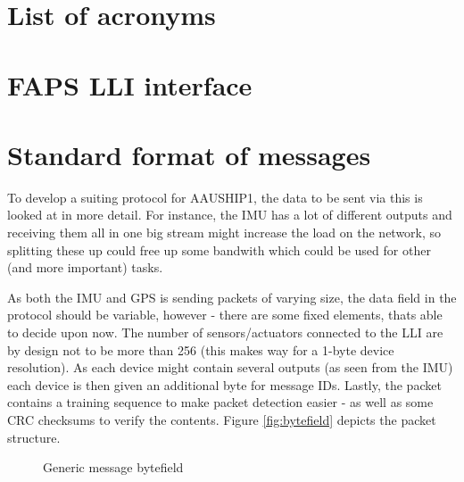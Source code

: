 \documentclass{article}
\begin{document}
\section{List of acronyms}
\begin{acronym}[TDMA]
\end{acronym}

\section{FAPS LLI interface}
\section{Standard format of messages}
To develop a suiting protocol for AAUSHIP1, the data to be sent via this is looked at in more detail. For instance, the \ac{IMU} has a lot of different outputs and receiving them all in one big stream might increase the load on the network, so splitting these up could free up some bandwith which could be used for other (and more important) tasks. 

As both the \ac{IMU} and \ac{GPS} is sending packets of varying size, the data field in the protocol should be variable, however - there are some fixed elements, thats able to decide upon now. The number of sensors/actuators connected to the \ac{LLI} are by design not to be more than 256 (this makes way for a 1-byte device resolution). As each device might contain several outputs (as seen from the \ac{IMU}) each device is then given an additional byte for message IDs. Lastly, the packet contains a training sequence to make packet detection easier - as well as some \ac{CRC} checksums to verify the contents. Figure \vref{fig:bytefield} depicts the packet structure.


\begin{figure}[h]
\centering
{}
\label{fig:bytefield}
\caption{Generic message bytefield}
\end{figure}
\end{document}
